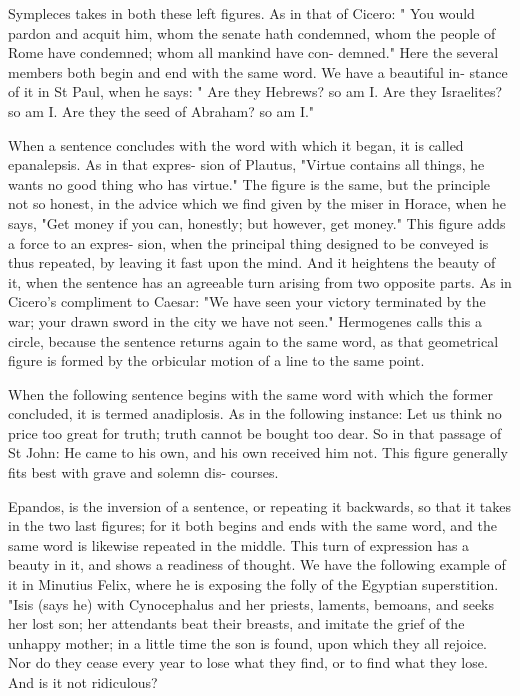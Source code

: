 \documentclass{article}
\begin{document}
Sympleces takes in both these left figures. As in that
of Cicero: " You would pardon and acquit him,
whom the senate hath condemned, whom the people of
Rome have condemned; whom all mankind have con-
demned." Here the several members both begin and
end with the same word. We have a beautiful in-
stance of it in St Paul, when he says: " Are they
Hebrews? so am I. Are they Israelites? so am I.
Are they the seed of Abraham? so am I."

When a sentence concludes with the word with which
it began, it is called epanalepsis. As in that expres-
sion of Plautus, "Virtue contains all things, he wants
no good thing who has virtue." The figure is the
same, but the principle not so honest, in the advice
which we find given by the miser in Horace, when he
says, "Get money if you can, honestly; but however,
get money." This figure adds a force to an expres-
sion, when the principal thing designed to be conveyed
is thus repeated, by leaving it fast upon the mind.
And it heightens the beauty of it, when the sentence
has an agreeable turn arising from two opposite parts.
As in Cicero's compliment to Caesar: "We have seen
your victory terminated by the war; your drawn
sword in the city we have not seen." Hermogenes
calls this a circle, because the sentence returns again
to the same word, as that geometrical figure is formed
by the orbicular motion of a line to the same
point.

When the following sentence begins with the same
word with which the former concluded, it is termed
anadiplosis. As in the following instance: Let us
think no price too great for truth; truth cannot be
bought too dear. So in that passage of St John: He
came to his own, and his own received him not. This
figure generally fits best with grave and solemn dis-
courses.

Epandos, is the inversion of a sentence, or repeating it backwards, so that it takes in the two last figures; for it both begins and ends with the same word, and the same word is likewise repeated in the middle. This turn of expression has a beauty in it, and shows a readiness of thought. We have the following example of it in Minutius Felix, where he is exposing the folly of the Egyptian superstition. "Isis (says he) with Cynocephalus and her priests, laments, bemoans, and seeks her lost son; her attendants beat their breasts, and imitate the grief of the unhappy mother; in a little time the son is found, upon which they all rejoice. Nor do they cease every year to lose what they find, or to find what they lose. And is it not ridiculous?
\end{document}
